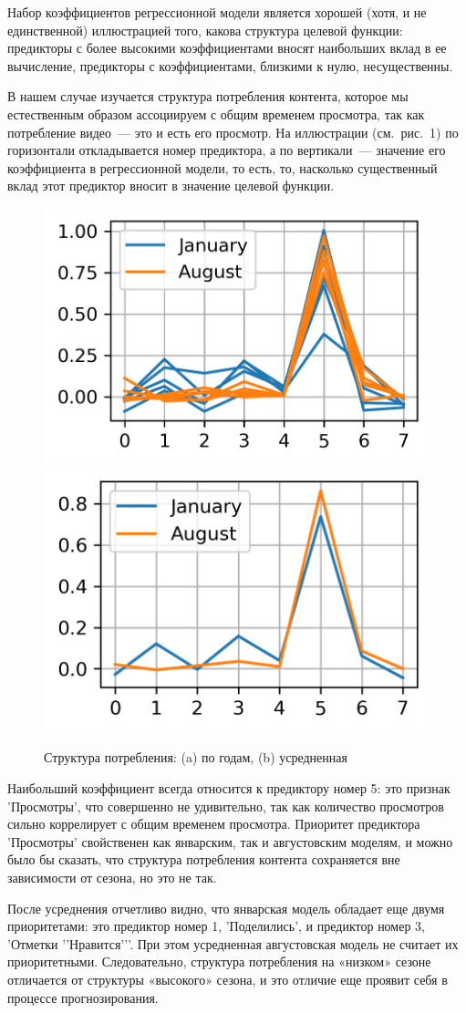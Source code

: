 \documentclass[a4paper,12pt]{article}
\begin{document}
Набор коэффициентов регрессионной модели является хорошей (хотя, и не единственной) иллюстрацией того, какова структура целевой функции: предикторы с более высокими коэффициентами вносят наибольших вклад в ее вычисление, предикторы с коэффициентами, близкими к нулю, несущественны. 

В нашем случае изучается структура потребления контента, которое мы естественным образом ассоциируем с общим временем просмотра, так как потребление видео~--- это и есть его просмотр. На иллюстрации (см. рис. 1) по горизонтали откладывается номер предиктора, а по вертикали~--- значение его коэффициента в регрессионной модели, то есть, то, насколько существенный вклад этот предиктор вносит в значение целевой функции.

\begin{figure}[!h]
	\centering
	\includegraphics[width=0.4\linewidth]{pictures/Регрессионные коэффициенты по годам}
	\hspace{0.05\linewidth}
	\includegraphics[width=0.4\linewidth]{pictures/Усредненные регрессионные коэффициенты}\\
	\caption{Структура потребления: (a) по годам, (b) усредненная}
\end{figure}

Наибольший коэффициент всегда относится к предиктору номер 5: это признак 'Просмотры', что совершенно не удивительно, так как количество просмотров сильно коррелирует с общим временем просмотра. Приоритет предиктора 'Просмотры' свойственен как январским, так и августовским моделям, и можно было бы сказать, что структура потребления контента сохраняется вне зависимости от сезона, но это не так.

После усреднения отчетливо видно, что январская модель обладает еще двумя приоритетами: это предиктор номер 1, 'Поделились', и предиктор номер 3, 'Отметки '{}'Нравится'{}'{}'. При этом усредненная августовская модель не считает их приоритетными. Следовательно, структура потребления на «низком» сезоне отличается от структуры «высокого» сезона, и это отличие еще проявит себя в процессе прогнозирования.
\end{document}
